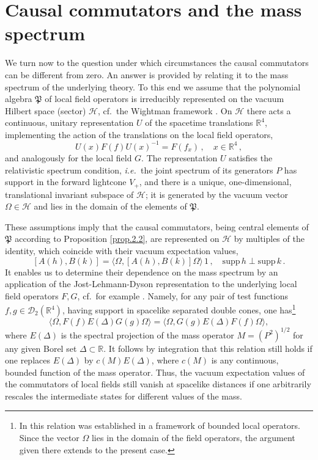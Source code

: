 \documentclass[11pt]{article}
\numberwithin{equation}{section}
\newcommand{\RR}{{\mathbb R}}
\newcommand{\Dc}{{\mathcal{D}}}
\newcommand{\Hc}{{\mathcal{H}}}
\newcommand{\fP}{{\mathfrak P}}
\newcommand{\supp}{{\mathrm{supp}}}
\def\ie{{\it i.e.\ }}
\begin{document}
\section{Causal commutators and the mass spectrum}
\label{sec4}

We turn now to the question under which 
circumstances the causal commutators can be different from zero. 
An answer is provided by relating 
it to the mass spectrum of the underlying theory. To this end 
we assume that the polynomial algebra $\fP$ of local field 
operators is irreducibly represented on the vacuum Hilbert 
space (sector) $\Hc$, cf.~the Wightman framework \cite{StWi}. 
On $\Hc$ there acts a continuous, unitary 
representation $U$ of the spacetime translations $\RR^4$, 
implementing the action of the translations on the local field operators,
$$
U(x) F(f) U(x)^{-1} = F(f_x) \, , \quad x \in \RR^4 \, ,
$$
and analogously for the local field $G$. The
representation $U$ satisfies the relativistic spectrum condition,  
\ie the joint spectrum of its generators $P$ has support in 
the forward lightcone $V_+$, and there is a unique, 
one-dimensional, translational 
invariant subspace of $\Hc$; it is generated by the vacuum vector 
$\Omega \in \Hc$ and lies in the domain of the elements of
$\fP$. 

\medskip 
These assumptions imply that the causal commutators,
being central elements of $\fP$ according to Proposition 
\ref{prop.2.2}, 
are represented on $\Hc$ by multiples of the identity, which 
coincide with their vacuum expectation values, 
$$
[A(h), B(k)] = \langle \Omega, [A(h), B(k)] \Omega \rangle \, 1 \, , 
\quad \supp \, h \perp \supp \, k \, .
$$
It enables us to determine their dependence on the
mass spectrum by an application
of the Jost-Lehmann-Dyson representation 
to the underlying local field operators $F,G$, cf.\ for example
\cite[Lem.~6.2]{DoHaRo}. Namely, 
for any pair of test functions $f,g \in \Dc_2(\RR^4)$, 
having support in spacelike separated double cones, one 
has\footnote{In \cite{DoHaRo} this relation was established in a 
framework of bounded local operators. Since the vector
$\Omega$ lies in the domain of the field operators, the argument
given there extends to the present case.}
$$
\langle \Omega, F(f) E(\Delta) G(g) \Omega \rangle 
= \langle \Omega, G(g) E(\Delta) F(f) \Omega \rangle, 
$$
where $E(\Delta)$ is the spectral projection of 
the mass operator $M = (P^2)^{1/2}$ for any given  
Borel set $\Delta \subset \RR$. It follows by 
integration that this relation still holds if 
one replaces $E(\Delta)$ by $c(M) E(\Delta)$, where $c(M)$ is any
continuous, bounded function of the mass operator. Thus, 
the vacuum expectation values of the commutators of local 
fields still vanish at spacelike distances 
if one arbitrarily rescales the 
intermediate states for different values of the mass. 
\end{document}
